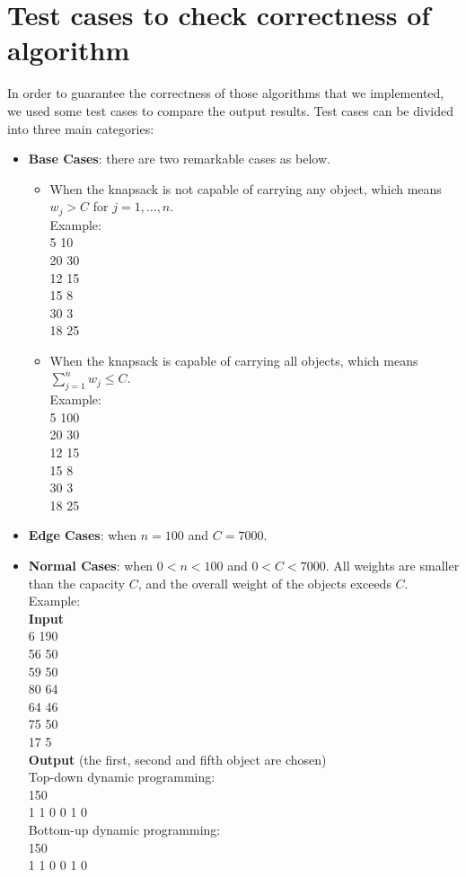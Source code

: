 \documentclass{article}
\begin{document}
\section{Test cases to check correctness of algorithm}
In order to guarantee the correctness of those algorithms that we implemented, we used some test cases to compare the output results. Test cases can be divided into three main categories:
\begin{itemize}
    \item \textbf{Base Cases}: there are two remarkable cases as below.
    \begin{itemize}
        \item When the knapsack is not capable of carrying any object, which means $w_j > C$ for $j = 1, ..., n$.\\
        Example:\\
        5 10\\
        20 30\\
        12 15\\
        15 8\\
        30 3\\
        18 25
        \item When the knapsack is capable of carrying all objects, which means $\sum\limits_{j = 1}^n w_j \leq C$.\\
        Example:\\
        5 100\\
        20 30\\
        12 15\\
        15 8\\
        30 3\\
        18 25
    \end{itemize}
    \item \textbf{Edge Cases}: when $n = 100$ and $C = 7000$.
    \item \textbf{Normal Cases}: when $0 < n < 100$ and $ 0 < C < 7000$. All weights are smaller than the capacity $C$, and the overall weight of the objects exceeds $C$.\\
    Example:\\
    \textbf{Input}\\
    6 190\\
    56 50\\
    59 50\\
    80 64\\
    64 46\\
    75 50\\
    17 5\\
    \textbf{Output} (the first, second and fifth object are chosen)\\
    Top-down dynamic programming:\\
    150 \\
    1 1 0 0 1 0  \\
    Bottom-up dynamic programming:\\
    150 \\
    1 1 0 0 1 0
\end{itemize}
\end{document}
